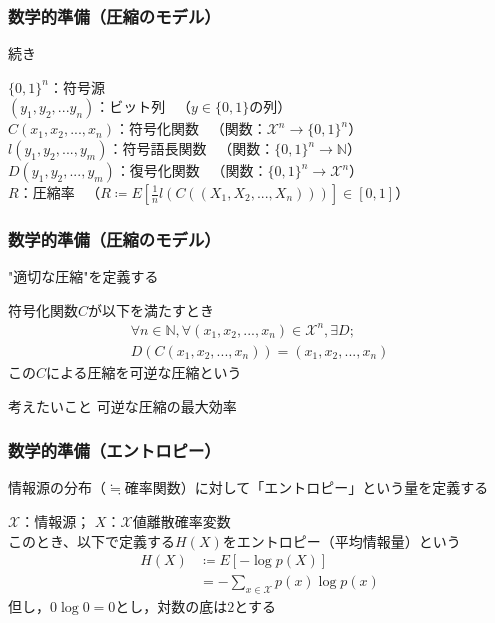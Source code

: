\documentclass{classes/myslide}
\begin{document}
\begin{frame}\frametitle{数学的準備（圧縮のモデル）}
  続き
  \begin{definition}[拡大情報源など]
    $\{0, 1\}^n$：符号源 \\
    $(y_1, y_2,... y_n)$：ビット列 \ （$y \in \{0, 1\}$の列）\\
    $C(x_1, x_2, ..., x_n )$：符号化関数 \ （関数：$\mathcal{X}^n \rightarrow \{0, 1\}^n$）\\
    $l(y_1, y_2, ..., y_m )$：符号語長関数 \ （関数：$\{0, 1\}^n \rightarrow \mathbb{N}$） \\
    $D(y_1, y_2, ..., y_m )$：復号化関数  \ （関数：$\{0, 1\}^n \rightarrow \mathcal{X}^n$） \\
    $R$：圧縮率 \ （$R \coloneq E[\frac{1}{n}l(C((X_1, X_2, ..., X_n)))] \in [0, 1]$）
  \end{definition}
\end{frame}

\begin{frame}\frametitle{数学的準備（圧縮のモデル）}
  "適切な圧縮"を定義する
  \begin{definition}[可逆な圧縮]
    符号化関数$C$が以下を満たすとき
    \begin{multline*}
      \forall n \in \mathbb{N}, \forall (x_1, x_2, ..., x_n ) \in \mathcal{X}^n, \exists D; \\ D(C(x_1, x_2, ..., x_n )) = (x_1, x_2, ..., x_n )
    \end{multline*}
    この$C$による圧縮を可逆な圧縮という
  \end{definition}
  \begin{alertblock}{考えたいこと}
    可逆な圧縮の最大効率
  \end{alertblock}
\end{frame}

\begin{frame}\frametitle{数学的準備（エントロピー）}
  情報源の分布（$\fallingdotseq$確率関数）に対して「エントロピー」という量を定義する
  \begin{definition}[エントロピー]
    $\mathcal{X}$：情報源； \quad $X$：$\mathcal{X}$値離散確率変数 \\
    このとき、以下で定義する$H(X)$をエントロピー（平均情報量）という
    \begin{align*}
      H(X) 
      &\coloneq E[-\log p(X)] \\ 
      &= -\sum_{x \in \mathcal{X}}p(x) \log p(x)
    \end{align*}
    但し，$0 \log 0 = 0$とし，対数の底は$2$とする
  \end{definition}
\end{frame}
\end{document}
